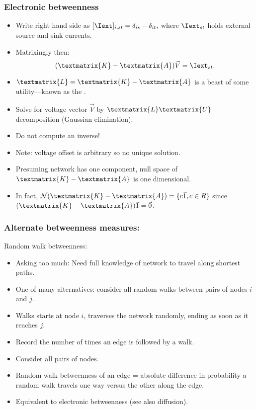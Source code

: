 \begin{frame}
  \frametitle{Electronic betweenness}

  \begin{itemize}
  \item<1-> 
    Write right hand side as
    $ 
    [\Iext]_{i,st} = \delta_{is} - \delta_{it},
    $
    where $\Iext_{st}$ holds external 
    source and sink currents.
  \item<2->
    Matrixingly then:
    $$
    (\textmatrix{K} - \textmatrix{A}) \vec{V} = \Iext_{st}.
    $$
  \item<3->
    $\textmatrix{L} = \textmatrix{K} - \textmatrix{A}$ is a beast of some utility---known as the .
  \item<4->
    Solve for voltage vector $\vec{V}$ 
    by \alert{$\textmatrix{L}\textmatrix{U}$ decomposition}
    (Gaussian elimination).
  \item<5->
    Do not compute an inverse!
  \item<6->
    \alert{Note:} 
    voltage offset is arbitrary
    so no unique solution.
  \item<7->
    Presuming network has one component,
    null space of $\textmatrix{K} - \textmatrix{A}$ is one dimensional.
  \item<8->
    In fact,
    $\mathcal{N}(\textmatrix{K} - \textmatrix{A}) = \{ c \vec{1}, c \in R \}$ since
    $(\textmatrix{K} - \textmatrix{A}) \vec{1} = \vec{0}$.
  \end{itemize}

\end{frame}


\begin{frame}
  \frametitle{Alternate betweenness measures:}

  \begin{block}{Random walk betweenness:}
    \begin{itemize}
    \item<1->
      \alert{Asking too much:} Need full knowledge of network to 
      travel along shortest paths.
    \item<2->
      One of many alternatives: consider all \alert{random walks}
      between pairs of nodes $i$ and $j$.
    \item<3->
      Walks starts at node $i$, traverses the network randomly,
      ending as soon as it reaches $j$.  
    \item<4->
      Record the number of times an edge is followed by a walk.
    \item<5->
      Consider all pairs of nodes.
    \item<6->
      Random walk betweenness of an edge = 
      absolute difference in probability a random walk
      travels one way versus the other along the edge.
    \item<7->
      Equivalent to electronic betweenness (see also diffusion).
    \end{itemize}
  \end{block}

\end{frame}

